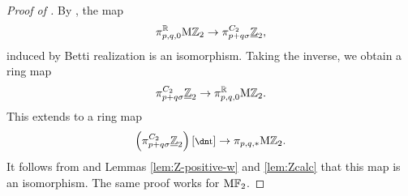 

\begin{proof}[Proof of ]
By , the map
\[\pi^{\mathbb{R}} _{p,q,0} \mathrm{M}\mathbb{Z}_{2} \to \pi^{C_2}_{p+q\sigma}\underline{\mathbb{Z}}_{2},\]
induced by Betti realization is an isomorphism.
Taking the inverse, we obtain a ring map
\[\pi^{C_2}_{p+q\sigma}\underline{\mathbb{Z}}_{2} \to \pi^{\mathbb{R}} _{p,q,0} \mathrm{M}\mathbb{Z}_{2}.\]
This extends to a ring map
\[\left(\pi^{C_2}_{p+q\sigma} \uZt \right) [\ta] \to \pi_{p,q,*} \HZt.\]
  It follows from  and Lemmas \ref{lem:Z-positive-w} and \ref{lem:Zcalc} that this map is an isomorphism.
The same proof works for $\mathrm{M}\mathbb{F}_2$.
%
%
%
%
\end{proof}

